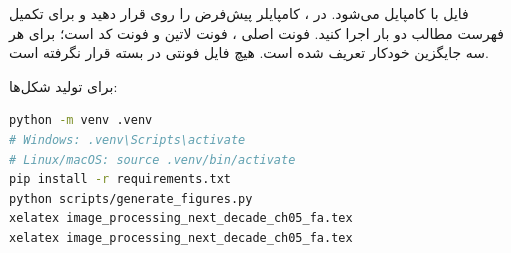 \documentclass[12pt,openany,oneside]{book}
\begin{document}
فایل با  کامپایل می‌شود. در ، کامپایلر پیش‌فرض را روی  قرار دهید و برای تکمیل فهرست مطالب دو بار اجرا کنید.
فونت اصلی ، فونت لاتین  و فونت کد  است؛ برای هر سه جایگزین خودکار تعریف شده است.
هیچ فایل فونتی در بسته قرار نگرفته است.

برای تولید شکل‌ها:
\begin{latin}
\begin{lstlisting}[language=bash]
python -m venv .venv
# Windows: .venv\Scripts\activate
# Linux/macOS: source .venv/bin/activate
pip install -r requirements.txt
python scripts/generate_figures.py
xelatex image_processing_next_decade_ch05_fa.tex
xelatex image_processing_next_decade_ch05_fa.tex
\end{lstlisting}
\end{latin}
\end{document}
